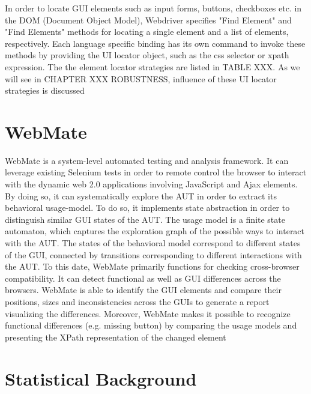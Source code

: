 In order to locate GUI elements such as input forms, buttons, checkboxes etc. in the DOM (Document Object Model), Webdriver specifies "Find Element" and "Find Elements" methods for locating a single element and a list of elements, respectively. Each language specific binding has its own command to invoke these methods by providing the UI locator object, such as the css selector or xpath expression. The the element locator strategies are listed in TABLE XXX. As we will see in CHAPTER XXX ROBUSTNESS, influence of these UI locator strategies is discussed 

\section{WebMate}
\label{sec:WebMate}
WebMate is a system-level automated testing and analysis framework. It can leverage existing Selenium tests in order to remote control the browser to interact with the dynamic web 2.0 applications involving JavaScript and Ajax elements. By doing so, it can systematically explore the AUT in order to extract its behavioral usage-model. To do so, it implements state abstraction in order to distinguish similar GUI states of the AUT. The usage model is a finite state automaton, which captures the exploration graph of the possible ways to interact with the AUT. The states of the behavioral model correspond to different states of the GUI, connected by transitions corresponding to different interactions with the AUT. 
To this date, WebMate primarily functions for checking cross-browser compatibility. It can detect functional as well as GUI differences across the browsers. WebMate is able to identify the GUI elements and compare their positions, sizes and inconsistencies across the GUIs to generate a report visualizing the differences. Moreover, WebMate makes it possible to recognize functional differences (e.g. missing button) by comparing the usage models and presenting the XPath representation of the changed element

\section{Statistical Background}
\label{sec:Statistical}